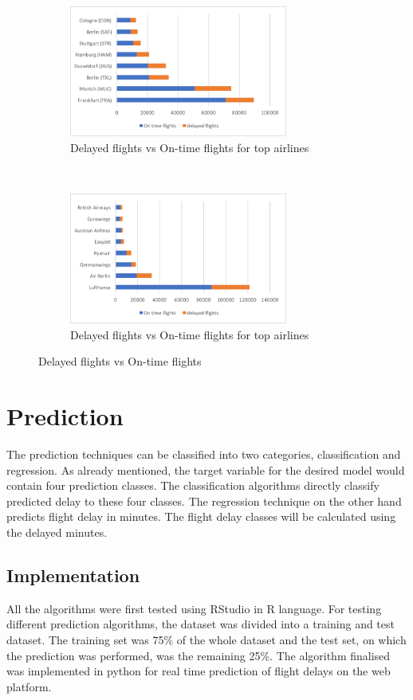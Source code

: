 \begin{figure}[h]
    \centering
    \begin{subfigure}[h]{0.5\textwidth}
        \centering
        \includegraphics[height=1.7in]{Figures/airport_delay_ratio.png}
        \caption{Delayed flights vs On-time flights for top airlines}
    \end{subfigure}%
    ~ 
    \begin{subfigure}[h]{0.5\textwidth}
        \centering
        \includegraphics[height=1.7in]{Figures/airline_delay_ratio.png}
        \caption{Delayed flights vs On-time flights for top airlines}
    \end{subfigure}
    \caption{Delayed flights vs On-time flights}
\end{figure}


\section{Prediction}
The prediction techniques can be classified into two categories, classification and regression. As already mentioned, the target variable for the desired model would contain four prediction classes. The classification algorithms directly classify predicted delay to these four classes. The regression technique on the other hand predicts flight delay in minutes. The flight delay classes will be calculated using the delayed minutes.

\subsection{Implementation}
All the algorithms were first tested using RStudio in R language. For testing different prediction algorithms, the dataset was divided into a training and test dataset. The training set was 75\% of the whole dataset and the test set, on which the prediction was performed, was the remaining 25\%. The algorithm finalised was implemented in python for real time prediction of flight delays on the web platform.

